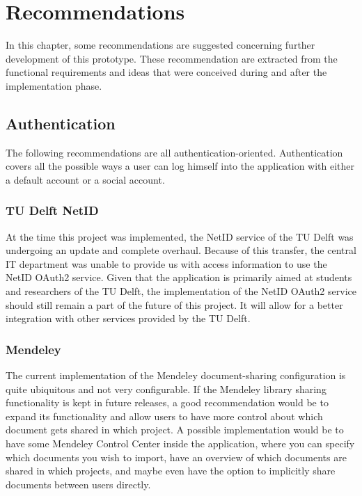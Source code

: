 \chapter{Recommendations}

In this chapter, some recommendations are suggested concerning further development of this prototype. These recommendation are extracted from the functional requirements and ideas that were conceived during and after the implementation phase.

\section{Authentication}

The following recommendations are all authentication-oriented. Authentication covers all the possible ways a user can log himself into the application with either a default account or a social account.

\subsection{TU Delft NetID}
At the time this project was implemented, the NetID service of the TU Delft was undergoing an update and complete overhaul. Because of this transfer, the central IT department was unable to provide us with access information to use the NetID OAuth2 service. Given that the application is primarily aimed at students and researchers of the TU Delft, the implementation of the NetID OAuth2 service should still remain a part of the future of this project. It will allow for a better integration with other services provided by the TU Delft.

\subsection{Mendeley}
The current implementation of the Mendeley document-sharing configuration is quite ubiquitous and not very configurable. If the Mendeley library sharing functionality is kept in future releases, a good recommendation would be to expand its functionality and allow users to have more control about which document gets shared in which project. A possible implementation would be to have some Mendeley Control Center inside the application, where you can specify which documents you wish to import, have an overview of which documents are shared in which projects, and maybe even have the option to implicitly share documents between users directly.

